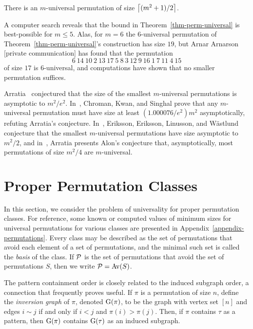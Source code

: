 \begin{theorem}
\label{thm-perm-universal}
There is an $m$-universal permutation of size $\ceil{(m^2+1)/2}$.
\end{theorem}

A computer search reveals that the bound in Theorem~\ref{thm-perm-universal} is best-possible for $m \le 5$. Alas, for $m=6$ the $6$-universal permutation of Theorem~\ref{thm-perm-universal}'s construction has size $19$, but Arnar Arnarson [private communication] has found that the permutation
\[
	6\ 14\ 10\ 2\ 13\ 17\ 5\ 8\ 3\ 12\ 9\ 16\ 1\ 7\ 11\ 4\ 15
\]
of size $17$ is $6$-universal, and computations have shown that no smaller permutation suffices.

Arratia~\cite[Conjecture 2]{arratia:on-the-stanley-:} conjectured that the size of the smallest $m$-universal permutations is asymptotic to $m^2/e^2$. In~\cite{chroman:lower-bounds:}, Chroman, Kwan, and Singhal prove that any $m$-universal permutation must have size at least $(1.000076/e^2)m^2$ asymptotically, refuting Arratia's conjecture. In~\cite{eriksson:dense-packing-o:}, Eriksson, Eriksson, Linusson, and W\"{a}stlund conjecture that the smallest $m$-universal permutations have size asymptotic to $m^2/2$, and in~\cite{arratia:on-the-stanley-:}, Arratia presents Alon's conjecture that, asymptotically, most permutations of size $m^2/4$ are $m$-universal.

\section{Proper Permutation Classes}
\label{sec-perm-proper}

In this section, we consider the problem of universality for proper permutation classes. For reference, some known or computed values of minimum sizes for universal permutations for various classes are presented in Appendix~\ref{appendix-permutations}. Every class may be described as the set of permutations that avoid each element of a set of permutations, and the minimal such set is called the \emph{basis} of the class. If $\P$ is the set of permutations that avoid the set of permutations $S$, then we write $\P = \Av(S)$.

The pattern containment order is closely related to the induced subgraph order, a connection that frequently proves useful. If $\pi$ is a permutation of size $n$, define the \emph{inversion graph} of $\pi$, denoted $\g(\pi)$, to be the graph with vertex set $[n]$ and edges $i \sim j$ if and only if $i < j$ and $\pi(i) > \pi(j)$. Then, if $\pi$ contains $\tau$ as a pattern, then $\g(\pi)$ contains $\g(\tau)$ as an induced subgraph.


